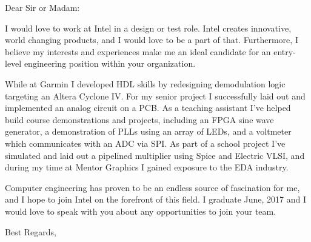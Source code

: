 \documentclass[]{friggeri-letter}
\begin{document}
       {}

\begin{letter}{}

\opening{Dear Sir or Madam:}

I would love to work at Intel in a design or test role. Intel creates innovative, world
changing products, and I would love to be a part of that. Furthermore, I  believe my interests and
experiences make me an ideal candidate for an entry-level engineering position within
your organization.

While at Garmin I developed HDL skills by redesigning demodulation logic
targeting an Altera Cyclone IV.  For my senior project I successfully 
laid out and implemented an analog circuit on a PCB.
As a teaching assistant I've helped build course demonstrations and 
projects, including an FPGA sine wave generator, a demonstration 
of PLLs using an array of LEDs, and a voltmeter which communicates with an ADC via SPI.
As part of a school project I've simulated and laid out a pipelined multiplier using Spice and
Electric VLSI, and during my time at Mentor Graphics I gained exposure to the EDA industry.

Computer engineering has proven to be an endless source of fascination for me, and
I hope to join Intel on the forefront of this field. I graduate June, 2017 and 
I would love to speak with you about any opportunities to join your team.

\closing{Best Regards,}

\end{letter}
\end{document}
